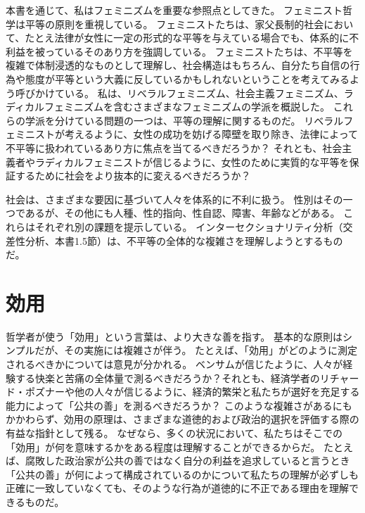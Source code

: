 \documentclass[paper=a4,book,openany]{jlreq}
\begin{document}
本書を通じて、私はフェミニズムを重要な参照点としてきた。
フェミニスト哲学は平等の原則を重視している。
フェミニストたちは、家父長制的社会において、たとえ法律が女性に一定の形式的な平等を与えている場合でも、体系的に不利益を被っているそのあり方を強調している。
フェミニストたちは、不平等を複雑で体制浸透的なものとして理解し、社会構造はもちろん、自分たち自信の行為や態度が平等という大義に反しているかもしれないということを考えてみるよう呼びかけている。
私は、リベラルフェミニズム、社会主義フェミニズム、ラディカルフェミニズムを含むさまざまなフェミニズムの学派を概説した。
これらの学派を分けている問題の一つは、平等の理解に関するものだ。
リベラルフェミニストが考えるように、女性の成功を妨げる障壁を取り除き、法律によって不平等に扱われているあり方に焦点を当てるべきだろうか？ それとも、社会主義者やラディカルフェミニストが信じるように、女性のために実質的な平等を保証するために社会をより抜本的に変えるべきだろうか？

社会は、さまざまな要因に基づいて人々を体系的に不利に扱う。
性別はその一つであるが、その他にも人種、性的指向、性自認、障害、年齢などがある。
これらはそれぞれ別の課題を提示している。
インターセクショナリティ分析（交差性分析、本書1.5節）は、不平等の全体的な複雑さを理解しようとするものだ。

\section{効用}

哲学者が使う「効用」という言葉は、より大きな善を指す。
基本的な原則はシンプルだが、その実施には複雑さが伴う。
たとえば、「効用」がどのように測定されるべきかについては意見が分かれる。
ベンサムが信じたように、人々が経験する快楽と苦痛の全体量で測るべきだろうか？それとも、経済学者のリチャード・ポズナーや他の人々が信じるように、経済的繁栄と私たちが選好を充足する能力によって「公共の善」を測るべきだろうか？ このような複雑さがあるにもかかわらず、効用の原理は、さまざまな道徳的および政治的選択を評価する際の有益な指針として残る。
なぜなら、多くの状況において、私たちはそこでの「効用」が何を意味するかをある程度は理解することができるからだ。
たとえば、腐敗した政治家が公共の善ではなく自分の利益を追求していると言うとき「公共の善」が何によって構成されているのかについて私たちの理解が必ずしも正確に一致していなくても、そのような行為が道徳的に不正である理由を理解できるものだ。
\end{document}
